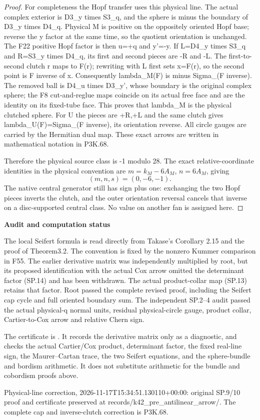 \begin{proof}
For completeness the Hopf transfer uses this physical line. The
actual complex exterior is D3\_y times S3\_q, and the sphere is
minus the boundary of D3\_y times D4\_q. Physical M is positive on
the oppositely oriented Hopf base; reverse the y factor at the same
time, so the quotient orientation is unchanged. The F22 positive
Hopf factor is then u=+q and y'=-y. If L=D4\_y times S3\_q and
R=S3\_y times D4\_q, its first and second pieces are -R and -L.
The first-to-second clutch r maps to F(r); rewriting with L first
sets x=F(r), so the second point is F inverse of x. Consequently
lambda\_M(F) is minus Sigma\_(F inverse). The removed ball is
D4\_u times D3\_y', whose boundary is the original complex sphere;
the F8 cut-and-reglue maps coincide on its actual free face and are
the identity on its fixed-tube face. This proves that lambda\_M is
the physical clutched sphere. For U the pieces are +R,+L and the
same clutch gives lambda\_U(F)=Sigma\_(F inverse), its orientation
reverse. All circle gauges are carried by the Hermitian dual map.
These exact arrows are written in mathematical notation in P3K.68.

Therefore the physical source class is -1 modulo 28. The exact
relative-coordinate identities in the physical convention are
\(m=k_M-6A_M\), \(n=6A_M\), giving
\[
                    (m,n,s)=(0,-6,-1).                  \tag{SP.23}
\]
The native central generator still has sign plus one: exchanging
the two Hopf pieces inverts the clutch, and the outer orientation
reversal cancels that inverse on a disc-supported central class.
No value on another fan is assigned here.
\end{proof}
\par

\medskip\noindent\textbf{Audit and computation status}

\par\nobreak

The local Seifert formula is read directly from Takase's Corollary
2.15 and the proof of Theorem3.2. The convention is fixed by the
nonzero Kummer comparison in F55. The earlier derivative matrix was
independently multiplied by root, but its proposed identification
with the actual Cox arrow omitted the determinant factor (SP.14)
and has been withdrawn. The actual product-collar map (SP.13)
retains that factor. Root passed the complete revised proof,
including the Seifert cap cycle and full oriented boundary sum.
The independent SP.2--4 audit passed the actual physical-q normal
units, residual physical-circle gauge, product collar, Cartier-to-Cox
arrow and relative Chern sign.

The certificate is .
It records the derivative matrix only as a diagnostic, and checks
the actual Cartier/Cox product, determinant factor,
the fixed real-line sign, the Maurer--Cartan trace, the two Seifert
equations, and the sphere-bundle and bordism arithmetic. It does not
substitute arithmetic for the bundle and cobordism proofs above.

Physical-line correction, 2026-11-17T15:34:51.130110+00:00: original SP.9/10 proof and certificate preserved at records/k42\_pre\_antilinear\_arrow/. The complete cap and inverse-clutch correction is P3K.68.
